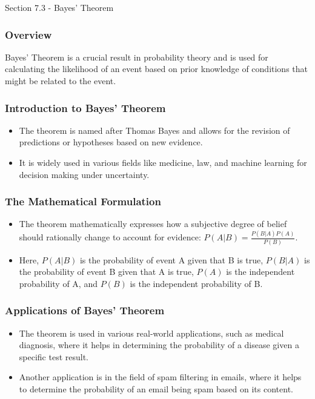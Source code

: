 \begin{notes}{Section 7.3 - Bayes' Theorem}
    \subsubsection*{Overview}
    Bayes' Theorem is a crucial result in probability theory and is used for calculating the likelihood of an event based on prior knowledge of conditions that might be related to the event. \vspace*{1em}

    \subsubsection*{Introduction to Bayes' Theorem}
    \begin{itemize}
        \item The theorem is named after Thomas Bayes and allows for the revision of predictions or hypotheses based on new evidence.
        \item It is widely used in various fields like medicine, law, and machine learning for decision making under uncertainty.
    \end{itemize}

    \subsubsection*{The Mathematical Formulation}
    \begin{itemize}
        \item The theorem mathematically expresses how a subjective degree of belief should rationally change to account for evidence: $P(A|B) = \frac{P(B|A)P(A)}{P(B)}$.
        \item Here, $P(A|B)$ is the probability of event A given that B is true, $P(B|A)$ is the probability of event B given that A is true, $P(A)$ is the independent probability of A, and $P(B)$ 
        is the independent probability of B.
    \end{itemize}

    \subsubsection*{Applications of Bayes' Theorem}
    \begin{itemize}
        \item The theorem is used in various real-world applications, such as medical diagnosis, where it helps in determining the probability of a disease given a specific test result.
        \item Another application is in the field of spam filtering in emails, where it helps to determine the probability of an email being spam based on its content.
    \end{itemize}


\end{notes}
